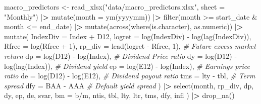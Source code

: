 \documentclass[
]{book}
\newenvironment{Shaded}{\begin{snugshade}}{\end{snugshade}}
\newcommand{\AttributeTok}[1]{\textcolor[rgb]{0.61,0.61,0.61}{#1}}
\newcommand{\CommentTok}[1]{\textcolor[rgb]{0.37,0.37,0.37}{\textit{#1}}}
\newcommand{\DecValTok}[1]{\textcolor[rgb]{0.06,0.06,0.06}{#1}}
\newcommand{\ErrorTok}[1]{\textcolor[rgb]{0.14,0.14,0.14}{\textbf{#1}}}
\newcommand{\FunctionTok}[1]{\textcolor[rgb]{0,0,0}{#1}}
\newcommand{\NormalTok}[1]{#1}
\newcommand{\OtherTok}[1]{\textcolor[rgb]{0.37,0.37,0.37}{#1}}
\newcommand{\SpecialCharTok}[1]{\textcolor[rgb]{0,0,0}{#1}}
\newcommand{\StringTok}[1]{\textcolor[rgb]{0.5,0.5,0.5}{#1}}
\begin{document}
\begin{Shaded}
\begin{Highlighting}[]
\NormalTok{macro\_predictors }\OtherTok{\textless{}{-}} \FunctionTok{read\_xlsx}\NormalTok{(}\StringTok{"data/macro\_predictors.xlsx"}\NormalTok{, }
                              \AttributeTok{sheet =} \StringTok{"Monthly"}\NormalTok{) }\SpecialCharTok{|}\ErrorTok{\textgreater{}}
  \FunctionTok{mutate}\NormalTok{(}\AttributeTok{month =} \FunctionTok{ym}\NormalTok{(yyyymm)) }\SpecialCharTok{|}\ErrorTok{\textgreater{}}
  \FunctionTok{filter}\NormalTok{(month }\SpecialCharTok{\textgreater{}=}\NormalTok{ start\_date }\SpecialCharTok{\&}\NormalTok{ month }\SpecialCharTok{\textless{}=}\NormalTok{ end\_date) }\SpecialCharTok{|}\ErrorTok{\textgreater{}}
  \FunctionTok{mutate}\NormalTok{(}\FunctionTok{across}\NormalTok{(}\FunctionTok{where}\NormalTok{(is.character), as.numeric)) }\SpecialCharTok{|}\ErrorTok{\textgreater{}}
  \FunctionTok{mutate}\NormalTok{(}
    \AttributeTok{IndexDiv =}\NormalTok{ Index }\SpecialCharTok{+}\NormalTok{ D12,}
    \AttributeTok{logret =} \FunctionTok{log}\NormalTok{(IndexDiv) }\SpecialCharTok{{-}} \FunctionTok{log}\NormalTok{(}\FunctionTok{lag}\NormalTok{(IndexDiv)),}
    \AttributeTok{Rfree =} \FunctionTok{log}\NormalTok{(Rfree }\SpecialCharTok{+} \DecValTok{1}\NormalTok{),}
    \AttributeTok{rp\_div =} \FunctionTok{lead}\NormalTok{(logret }\SpecialCharTok{{-}}\NormalTok{ Rfree, }\DecValTok{1}\NormalTok{), }\CommentTok{\# Future excess market return}
    \AttributeTok{dp =} \FunctionTok{log}\NormalTok{(D12) }\SpecialCharTok{{-}} \FunctionTok{log}\NormalTok{(Index), }\CommentTok{\# Dividend Price ratio}
    \AttributeTok{dy =} \FunctionTok{log}\NormalTok{(D12) }\SpecialCharTok{{-}} \FunctionTok{log}\NormalTok{(}\FunctionTok{lag}\NormalTok{(Index)), }\CommentTok{\# Dividend yield}
    \AttributeTok{ep =} \FunctionTok{log}\NormalTok{(E12) }\SpecialCharTok{{-}} \FunctionTok{log}\NormalTok{(Index), }\CommentTok{\# Earnings price ratio}
    \AttributeTok{de =} \FunctionTok{log}\NormalTok{(D12) }\SpecialCharTok{{-}} \FunctionTok{log}\NormalTok{(E12), }\CommentTok{\# Dividend payout ratio}
    \AttributeTok{tms =}\NormalTok{ lty }\SpecialCharTok{{-}}\NormalTok{ tbl, }\CommentTok{\# Term spread}
    \AttributeTok{dfy =}\NormalTok{ BAA }\SpecialCharTok{{-}}\NormalTok{ AAA }\CommentTok{\# Default yield spread}
\NormalTok{  ) }\SpecialCharTok{|}\ErrorTok{\textgreater{}}
  \FunctionTok{select}\NormalTok{(month, rp\_div, dp, dy, ep, de, svar,}
    \AttributeTok{bm =} \StringTok{\textasciigrave{}}\AttributeTok{b/m}\StringTok{\textasciigrave{}}\NormalTok{, ntis, tbl, lty, ltr,}
\NormalTok{    tms, dfy, infl}
\NormalTok{  ) }\SpecialCharTok{|}\ErrorTok{\textgreater{}}
  \FunctionTok{drop\_na}\NormalTok{()}
\end{Highlighting}
\end{Shaded}
\end{document}
